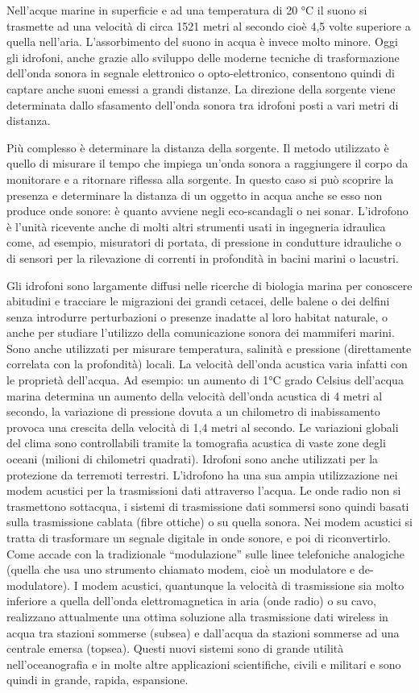 Nell’acque marine in superficie e ad una temperatura di 20 °C il suono si trasmette ad una velocità di circa 1521 metri al secondo cioè 4,5 volte superiore a quella nell'aria. L’assorbimento del suono in acqua è invece molto minore. Oggi gli idrofoni, anche grazie allo sviluppo delle moderne tecniche di trasformazione dell’onda sonora in segnale elettronico o opto-elettronico, consentono quindi di captare anche suoni emessi a grandi distanze. La direzione della sorgente viene determinata dallo sfasamento dell’onda sonora tra idrofoni posti a vari metri di distanza.

Più complesso è determinare la distanza della sorgente. Il metodo utilizzato è quello di misurare il tempo che impiega un’onda sonora a raggiungere il corpo da monitorare e a ritornare riflessa alla sorgente. In questo caso si può scoprire la presenza e determinare la distanza di un oggetto in acqua anche se esso non produce onde sonore: è quanto avviene negli eco-scandagli o nei sonar. L’idrofono è l’unità ricevente anche di molti altri strumenti usati in ingegneria idraulica come, ad esempio, misuratori di portata, di pressione in condutture idrauliche o di sensori per la rilevazione di correnti in profondità in bacini marini o lacustri.

Gli idrofoni sono largamente diffusi nelle ricerche di biologia marina per conoscere abitudini e tracciare le migrazioni dei grandi cetacei, delle balene o dei delfini senza introdurre perturbazioni o presenze inadatte al loro habitat naturale, o anche per studiare l’utilizzo della comunicazione sonora dei mammiferi marini. Sono anche utilizzati per misurare temperatura, salinità e pressione (direttamente correlata 
con la profondità) locali. La velocità dell’onda acustica varia infatti con le proprietà dell’acqua. 
Ad esempio: un aumento di 1°C grado Celsius  dell’acqua marina determina un aumento della velocità dell’onda acustica di 4 metri al secondo, la variazione di pressione dovuta a un chilometro di inabissamento provoca una crescita della velocità di 1,4 metri al secondo. Le variazioni globali del clima sono controllabili tramite la tomografia acustica di vaste zone degli oceani (milioni di chilometri quadrati). Idrofoni sono anche utilizzati per la protezione da terremoti terrestri. 
L’idrofono ha una sua ampia utilizzazione nei modem acustici per la trasmissioni dati attraverso l’acqua. Le onde radio non si trasmettono sottacqua, i sistemi di trasmissione dati sommersi sono quindi basati sulla trasmissione cablata (fibre ottiche) o su quella sonora. Nei modem acustici si tratta di trasformare un segnale digitale in onde sonore, e poi di riconvertirlo. Come accade con la tradizionale “modulazione” sulle linee telefoniche analogiche (quella che usa uno strumento chiamato modem, cioè un modulatore e de-modulatore). I modem acustici, quantunque la velocità di trasmissione sia molto inferiore a quella dell’onda elettromagnetica in aria (onde radio) o su cavo, realizzano attualmente una ottima soluzione alla trasmissione dati wireless in acqua tra stazioni sommerse (subsea) e dall’acqua da stazioni sommerse ad una centrale emersa (topsea). Questi nuovi sistemi sono di grande utilità nell’oceanografia e in molte altre applicazioni scientifiche, civili e militari e sono quindi in grande, rapida, espansione. 

